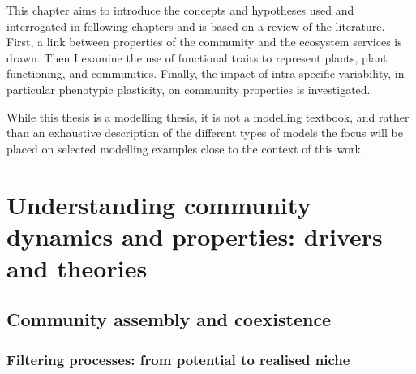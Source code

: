 \begin{fullwidth}
This chapter aims to introduce the concepts and hypotheses used and interrogated in following chapters and is based on a review of the literature. First, a link between properties of the community and the ecosystem services is drawn. Then I examine the use of functional traits to represent plants, plant functioning, and communities. Finally, the impact of intra-specific variability, in particular phenotypic plasticity, on community properties is investigated.

While this thesis is a modelling thesis, it is not a modelling textbook, and rather than an exhaustive description of the different types of models the focus will be placed on selected modelling examples close to the context of this work.
\end{fullwidth}

\chapter{Understanding community dynamics and properties: drivers and theories}\label{chapter:coexistence}





\section{Community assembly and coexistence}



\subsection{Filtering processes: from potential to realised niche}



